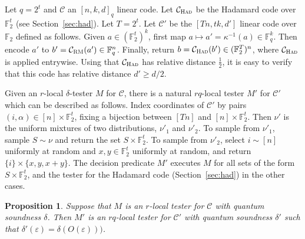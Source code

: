 \documentclass[11pt]{article}
\newtheorem{proposition}[theorem]{Proposition}
\theoremstyle{definition}
\newcommand{\code}{\mathcal{C}}
\newcommand{\F}{\ensuremath{\mathbb{F}}}
\newcommand{\mC}{\ensuremath{\mathcal{C}}}
\newcommand{\RM}{\ensuremath{\textsc{RM}}}
\newcommand{\Had}{\ensuremath{\textsc{Had}}}
\newcommand{\eps}{\varepsilon}
\begin{document}
Let $q=2^t$ and $\code$ an $[n,k,d]_q$ linear code. Let $\code_{\Had}$ be the Hadamard code over $\F_2^t$ (see Section~\ref{sec:had}). Let $T=2^t$.
Let $\mC'$ be the $[Tn,tk,d']$ linear code over $\F_2$ defined as follows. Given $a\in (\F_2^t)^{k}$, first map $a\mapsto a'=\kappa^{-1}(a) \in \F_q^{k}$. Then encode $a'$ to $b'=\code_\RM(a')\in \F_q^n$. Finally, return $b=\code_\Had(b')\in(\F_2^T)^n$, where $\code_\Had$ is applied entrywise. Using that $\code_\Had$ has relative distance $\frac{1}{2}$, it is easy to verify that this code has relative distance $d'\geq d/2$.

Given an $r$-local $\delta$-tester $M$ for $\code$, there is a natural $rq$-local tester $M'$ for $\code'$ which can be described as follows. Index coordinates of $\code'$ by pairs $(i,\alpha)\in [n]\times\F_2^t$, fixing a bijection between $[Tn]$ and $[n]\times \F_2^t$. Then $\nu'$ is the uniform mixtures of two distributions, $\nu'_1$ and $\nu'_2$. To sample from $\nu'_1$, sample $S\sim\nu$ and return the set $S\times\F_2^t$. To sample from $\nu'_2$, select $i\sim[n]$ uniformly at random and $x,y\in\F_2^t$ uniformly at random, and return $\{i\}\times\{x,y,x+y\}$. The decision predicate $M'$ executes $M$ for all sets of the form $S\times \F_2^t$, and the tester for the Hadamard code (Section~\ref{sec:had}) in the other cases.


\begin{proposition}\label{prop:q-to-2}
Suppose that $M$ is an $r$-local tester for $\code$ with quantum soundness $\delta$. Then $M'$ is an $rq$-local tester for $\code'$ with quantum soundness $\delta'$ such that $\delta'(\eps)=\delta(O(\eps)))$. 
\end{proposition}
\end{document}

